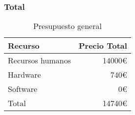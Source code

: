 \subsubsection{Total}
\begin{table}
    \centering
    \begin{tabular}[ht]{l|r} 
        \textbf{Recurso} & \textbf{Precio Total} \\
        \hline
        Recursos humanos & 14000\euro   \\
        Hardware         & 740\euro   \\
        Software         & 0\euro   \\
        \hline
        Total           & 14740\euro   \\
    \end{tabular}
    \caption{Presupuesto general}
    \label{tab:total-budget}
\end{table}

\pagebreak
